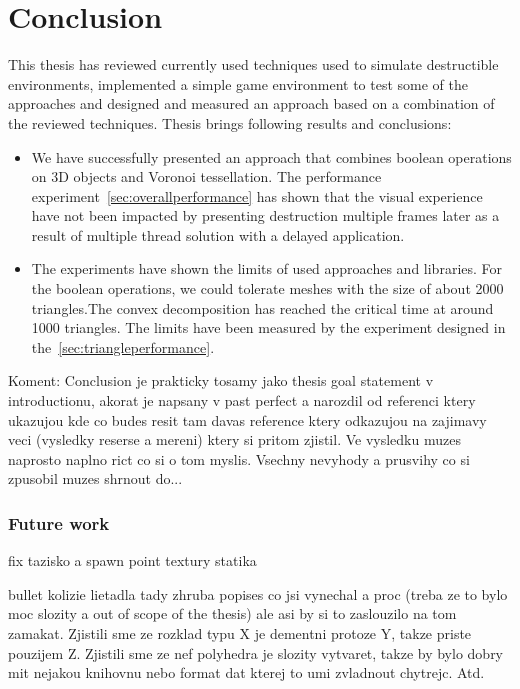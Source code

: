 \chapter*{Conclusion}

This thesis has reviewed currently used techniques used to simulate destructible environments, implemented a simple game environment to test some of the approaches and designed and measured an approach based on a combination of the reviewed techniques. Thesis brings following results and conclusions:

\begin{itemize}
\item We have successfully presented an approach that combines boolean operations on 3D objects and Voronoi tessellation. The performance experiment~\cref{sec:overallperformance} has shown that the visual experience have not been impacted by presenting destruction multiple frames later as a result of multiple thread solution with a delayed application.

\item The experiments have shown the limits of used approaches and libraries. 
For the boolean operations, we could tolerate meshes with the size of about 2000 triangles.The convex decomposition has reached the critical time at around 1000 triangles. The limits have been measured by the experiment designed in the~\cref{sec:triangleperformance}. 
\end{itemize}



Koment: Conclusion je prakticky tosamy jako thesis goal statement v introductionu, akorat je napsany v past perfect a narozdil od referenci ktery ukazujou kde co budes resit tam davas reference ktery odkazujou na zajimavy veci (vysledky reserse a mereni) ktery si pritom zjistil. Ve vysledku muzes naprosto naplno rict co si o tom myslis. Vsechny nevyhody a prusvihy co si zpusobil muzes shrnout do...

\subsection*{Future work}
fix tazisko a spawn point
textury
statika

bullet kolizie lietadla
tady zhruba popises co jsi vynechal a proc (treba ze to bylo moc slozity a out of scope of the thesis) ale asi by si to zaslouzilo na tom zamakat. Zjistili sme ze rozklad typu X je dementni protoze Y, takze priste pouzijem Z. Zjistili sme ze nef polyhedra je slozity vytvaret, takze by bylo dobry mit nejakou knihovnu nebo format dat kterej to umi zvladnout chytrejc. Atd.
